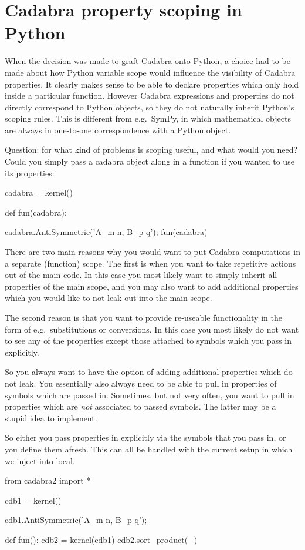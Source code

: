 
\section{Cadabra property scoping in Python}

When the decision was made to graft Cadabra onto Python, a choice had
to be made about how Python variable scope would influence the
visibility of Cadabra properties. It clearly makes sense to be able to
declare properties which only hold inside a particular
function. However Cadabra expressions and properties do not directly
correspond to Python objects, so they do not naturally inherit
Python's scoping rules. This is different from e.g.~SymPy, in which
mathematical objects are always in one-to-one correspondence with a
Python object.

Question: for what kind of problems is scoping useful, and what would
you need? Could you simply pass a cadabra object along in a function
if you wanted to use its properties:

cadabra = kernel()

def fun(cadabra):
    


cadabra.AntiSymmetric('{A_{m n}, B_{p q}}');
fun(cadabra)


There are two main reasons why you would want to put Cadabra
computations in a separate (function) scope. The first is when you
want to take repetitive actions out of the main code. In this case you
most likely want to simply inherit all properties of the main scope,
and you may also want to add additional properties which you would
like to not leak out into the main scope.

The second reason is that you want to provide re-useable functionality
in the form of e.g.~substitutions or conversions. In this case you
most likely do not want to see any of the properties except those
attached to symbols which you pass in explicitly.

So you always want to have the option of adding additional properties
which do not leak. You essentially also always need to be able to
pull in properties of symbols which are passed in. Sometimes, but not
very often, you want to pull in properties which are \emph{not}
associated to passed symbols. The latter may be a stupid idea to
implement.

So either you pass properties in explicitly via the symbols that you
pass in, or you define them afresh. This can all be handled with the
current setup in which we inject into local.



from cadabra2 import *

cdb1 = kernel()

cdb1.AntiSymmetric('{A_{m n}, B_{p q}}');

def fun():
   cdb2 = kernel(cdb1)
   cdb2.sort_product(_) 
